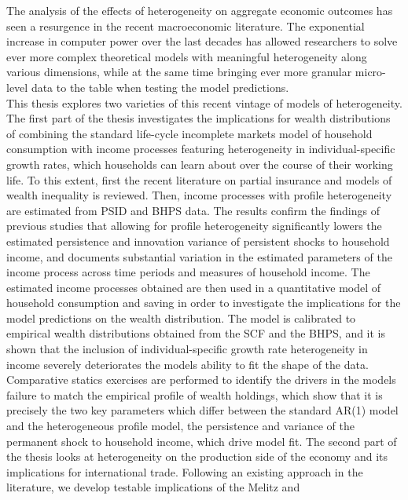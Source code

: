 \thispagestyle{plain}

The analysis of the effects of heterogeneity on aggregate economic outcomes has 
seen a resurgence in the recent macroeconomic literature. The exponential increase
 in computer power over the last decades has allowed researchers to solve ever 
more complex theoretical models with meaningful heterogeneity along various 
dimensions, while at the same time bringing ever more granular micro-level data 
to the table when testing the model predictions. \\
This thesis explores two varieties of this recent vintage of models of heterogeneity.
The first part of the thesis investigates the implications for wealth distributions
of combining the standard life-cycle incomplete markets model of household 
consumption with income processes featuring heterogeneity in individual-specific
growth rates, which households can learn about over the course of their working life.
To this extent, first the recent literature on partial insurance and models
of wealth inequality is reviewed. Then, income processes with profile heterogeneity
 are estimated from PSID and BHPS data. The results confirm the findings of 
previous studies that allowing for profile heterogeneity significantly lowers
the estimated persistence and innovation variance of persistent shocks to household
income, and documents substantial variation in the estimated parameters of the 
income process across time periods and measures of household income.
The estimated income processes obtained are then used in a quantitative model of 
household consumption and saving in order to investigate the implications for the 
model predictions on the wealth distribution. The model is calibrated to
 empirical wealth distributions obtained from the SCF and the BHPS, and it is shown
that the inclusion of individual-specific growth rate heterogeneity in income 
severely deteriorates the models ability to fit the shape of the data. 
Comparative statics exercises are performed to identify the drivers in the models
failure to match the empirical profile of wealth holdings, which show that it 
is precisely the two key parameters which differ between the standard AR(1) model
and the heterogeneous profile model, the persistence and variance of the permanent
shock to household income, which drive model fit. 
The second part of the thesis looks at heterogeneity on the production side of 
the economy and its implications for international trade. Following an existing 
approach in the literature, we develop testable implications of the Melitz and 
